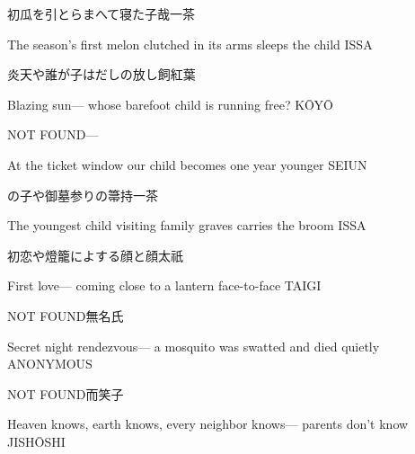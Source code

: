 \begin{haiku}
    {\FH 初瓜を引とらまへて寝た子哉}\hfill{\FH 一茶}

    \vin{} The season's first melon
    \vin{} \vin{} clutched in its arms
    \vin{} \vin{} \vin{} sleeps the child \hspace{\fill} ISSA
\end{haiku}

\begin{haiku}
   {\FH 炎天や誰が子はだしの放し飼}\hfill{紅葉}

    \vin{} Blazing sun---
    \vin{} \vin{} whose barefoot child
    \vin{} \vin{} \vin{} is running free? \hspace{\fill} K\={O}Y\={O}
\end{haiku}

\begin{haiku}
   NOT FOUND\hfill{---}

    \vin{} At the ticket window
    \vin{} \vin{} our child becomes
    \vin{} \vin{} \vin{} one year younger \hspace{\fill} SEIUN
\end{haiku}

\begin{haiku}
    {\FH {}の子や御墓参りの箒持}\hfill{\FH 一茶}

    \vin{} The youngest child
    \vin{} \vin{} visiting family graves
    \vin{} \vin{} \vin{} carries the broom \hspace{\fill} ISSA
\end{haiku}

\begin{haiku}
    {\FH 初恋や燈籠によする顔と顔}\hfill{\FH 太祇}

    \vin{} First love---
    \vin{} \vin{} coming close to a lantern
    \vin{} \vin{} \vin{} face-to-face \hspace{\fill} TAIGI
\end{haiku}

\begin{haiku}
    NOT FOUND\hfill{\FH 無名氏}

    \vin{} Secret night rendezvous---
    \vin{} \vin{} a mosquito was swatted
    \vin{} \vin{} \vin{} and died quietly \hspace{\fill} ANONYMOUS
\end{haiku}

\begin{haiku}
    NOT FOUND\hfill{\FH 而笑子}

    \vin{} Heaven knows,
    \vin{} \vin{} earth knows, every neighbor knows---
    \vin{} \vin{} \vin{} parents don't know \hspace{\fill} JISH\={O}SHI
\end{haiku}

